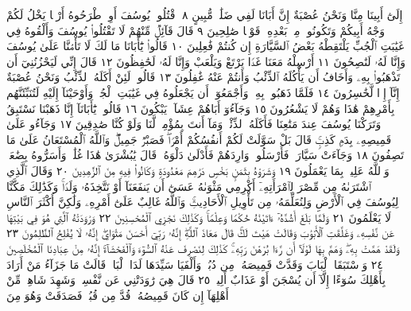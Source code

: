 إِلَىٰٓ أَبِينَا مِنَّا وَنَحْنُ عُصْبَةٌ إِنَّ أَبَانَا لَفِي ضَلَٰلࣲ مُّبِينٍ ٨
ٱقْتُلُوا۟ يُوسُفَ أَوِ ٱطْرَحُوهُ أَرْضࣰا يَخْلُ لَكُمْ وَجْهُ أَبِيكُمْ
وَتَكُونُوا۟ مِنۢ بَعْدِهِۦ قَوْمࣰا صَٰلِحِينَ ٩ قَالَ قَآئِلࣱ مِّنْهُمْ
لَا تَقْتُلُوا۟ يُوسُفَ وَأَلْقُوهُ فِي غَيَٰبَتِ ٱلْجُبِّ يَلْتَقِطْهُ بَعْضُ
ٱلسَّيَّارَةِ إِن كُنتُمْ فَٰعِلِينَ ١٠ قَالُوا۟ يَٰٓأَبَانَا مَا لَكَ لَا تَأْمَ۬نَّا عَلَىٰ
يُوسُفَ وَإِنَّا لَهُۥ لَنَٰصِحُونَ ١١ أَرْسِلْهُ مَعَنَا غَدࣰا يَرْتَعْ وَيَلْعَبْ
وَإِنَّا لَهُۥ لَحَٰفِظُونَ ١٢ قَالَ إِنِّي لَيَحْزُنُنِيٓ أَن تَذْهَبُوا۟ بِهِۦ وَأَخَافُ
أَن يَأْكُلَهُ ٱلذِّئْبُ وَأَنتُمْ عَنْهُ غَٰفِلُونَ ١٣ قَالُوا۟ لَئِنْ
أَكَلَهُ ٱلذِّئْبُ وَنَحْنُ عُصْبَةٌ إِنَّآ إِذࣰا لَّخَٰسِرُونَ ١٤
فَلَمَّا ذَهَبُوا۟ بِهِۦ وَأَجْمَعُوٓا۟ أَن يَجْعَلُوهُ فِي غَيَٰبَتِ ٱلْجُبِّۚ وَأَوْحَيْنَآ
إِلَيْهِ لَتُنَبِّئَنَّهُم بِأَمْرِهِمْ هَٰذَا وَهُمْ لَا يَشْعُرُونَ ١٥ وَجَآءُوٓ
أَبَاهُمْ عِشَآءࣰ يَبْكُونَ ١٦ قَالُوا۟ يَٰٓأَبَانَآ إِنَّا ذَهَبْنَا نَسْتَبِقُ
وَتَرَكْنَا يُوسُفَ عِندَ مَتَٰعِنَا فَأَكَلَهُ ٱلذِّئْبُۖ وَمَآ أَنتَ
بِمُؤْمِنࣲ لَّنَا وَلَوْ كُنَّا صَٰدِقِينَ ١٧ وَجَآءُو عَلَىٰ قَمِيصِهِۦ
بِدَمࣲ كَذِبࣲۚ قَالَ بَلْ سَوَّلَتْ لَكُمْ أَنفُسُكُمْ أَمْرࣰاۖ فَصَبْرࣱ جَمِيلࣱۖ
وَٱللَّهُ ٱلْمُسْتَعَانُ عَلَىٰ مَا تَصِفُونَ ١٨ وَجَآءَتْ سَيَّارَةࣱ
فَأَرْسَلُوا۟ وَارِدَهُمْ فَأَدْلَىٰ دَلْوَهُۥۖ قَالَ يَٰبُشْرَىٰ هَٰذَا غُلَٰمࣱۚ وَأَسَرُّوهُ
بِضَٰعَةࣰۚ وَٱللَّهُ عَلِيمُۢ بِمَا يَعْمَلُونَ ١٩ وَشَرَوْهُ بِثَمَنِۭ بَخْسࣲ
دَرَٰهِمَ مَعْدُودَةࣲ وَكَانُوا۟ فِيهِ مِنَ ٱلزَّٰهِدِينَ ٢٠ وَقَالَ
ٱلَّذِي ٱشْتَرَىٰهُ مِن مِّصْرَ لِٱمْرَأَتِهِۦٓ أَكْرِمِي مَثْوَىٰهُ عَسَىٰٓ
أَن يَنفَعَنَآ أَوْ نَتَّخِذَهُۥ وَلَدࣰاۚ وَكَذَٰلِكَ مَكَّنَّا لِيُوسُفَ فِي
ٱلْأَرْضِ وَلِنُعَلِّمَهُۥ مِن تَأْوِيلِ ٱلْأَحَادِيثِۚ وَٱللَّهُ غَالِبٌ عَلَىٰٓ
أَمْرِهِۦ وَلَٰكِنَّ أَكْثَرَ ٱلنَّاسِ لَا يَعْلَمُونَ ٢١ وَلَمَّا بَلَغَ أَشُدَّهُۥٓ
ءَاتَيْنَٰهُ حُكْمࣰا وَعِلْمࣰاۚ وَكَذَٰلِكَ نَجْزِي ٱلْمُحْسِنِينَ ٢٢
وَرَٰوَدَتْهُ ٱلَّتِي هُوَ فِي بَيْتِهَا عَن نَّفْسِهِۦ وَغَلَّقَتِ ٱلْأَبْوَٰبَ
وَقَالَتْ هَيْتَ لَكَۚ قَالَ مَعَاذَ ٱللَّهِۖ إِنَّهُۥ رَبِّيٓ أَحْسَنَ مَثْوَايَۖ
إِنَّهُۥ لَا يُفْلِحُ ٱلظَّٰلِمُونَ ٢٣ وَلَقَدْ هَمَّتْ بِهِۦۖ وَهَمَّ بِهَا
لَوْلَآ أَن رَّءَا بُرْهَٰنَ رَبِّهِۦۚ كَذَٰلِكَ لِنَصْرِفَ عَنْهُ ٱلسُّوٓءَ
وَٱلْفَحْشَآءَۚ إِنَّهُۥ مِنْ عِبَادِنَا ٱلْمُخْلَصِينَ ٢٤ وَٱسْتَبَقَا
ٱلْبَابَ وَقَدَّتْ قَمِيصَهُۥ مِن دُبُرࣲ وَأَلْفَيَا سَيِّدَهَا لَدَا ٱلْبَابِۚ
قَالَتْ مَا جَزَآءُ مَنْ أَرَادَ بِأَهْلِكَ سُوٓءًا إِلَّآ أَن يُسْجَنَ أَوْ عَذَابٌ
أَلِيمࣱ ٢٥ قَالَ هِيَ رَٰوَدَتْنِي عَن نَّفْسِيۚ وَشَهِدَ شَاهِدࣱ مِّنْ
أَهْلِهَآ إِن كَانَ قَمِيصُهُۥ قُدَّ مِن قُبُلࣲ فَصَدَقَتْ وَهُوَ مِنَ
